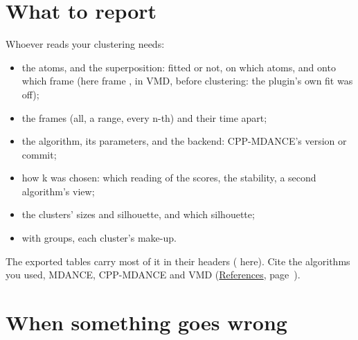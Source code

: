 \documentclass[11pt,letterpaper]{article}
\newcommand{\file}[1]{\path{#1}}
\begin{document}
\section{What to report}
\label{sec:report}

Whoever reads your clustering needs:

\begin{itemize}
  \item the atoms, and the superposition: fitted or not, on which atoms, and
    onto which frame (here frame \qsFitFrame, in VMD, before clustering: the
    plugin's own fit was off);
  \item the frames (all, a range, every n-th) and their time apart;
  \item the algorithm, its parameters, and the backend: CPP-MDANCE's version or
    commit;
  \item how k was chosen: which reading of the scores, the stability, a second
    algorithm's view;
  \item the clusters' sizes and silhouette, and which silhouette;
  \item with groups, each cluster's make-up.
\end{itemize}

The exported tables carry most of it in their headers (\file{tau_summary.txt}
here). Cite the algorithms you used, MDANCE, CPP-MDANCE and VMD
(\hyperref[sec:references]{References}, page~\pageref{sec:references}).

\section{When something goes wrong}
\label{sec:problems}
\end{document}
